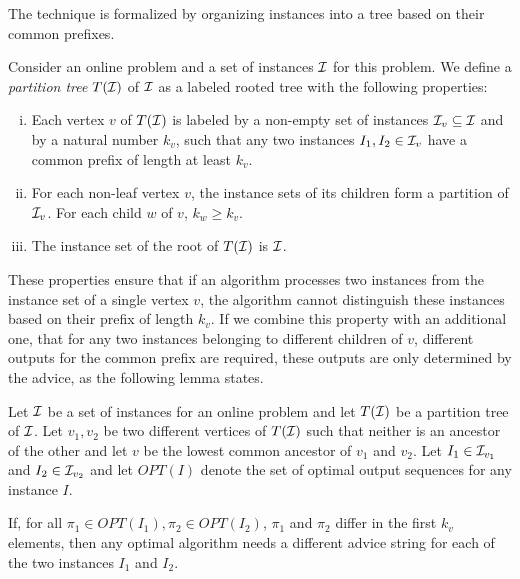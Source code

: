 The technique is formalized by organizing instances into a tree based on
their common prefixes.

\begin{definition}\label{definition:partition-tree}
    Consider an online problem and a set of instances $\mathcal{I}$ for this problem.
    We define a \emph{partition tree} $T(\mathcal{I})$ of $\mathcal{I}$ as a labeled rooted
    tree with the following properties:
    \begin{enumerate}[(i)]
        \item Each vertex $v$ of $T(\mathcal{I})$ is labeled by a non-empty set of
            instances $\mathcal{I}_v \subseteq \mathcal{I}$ and by a natural number $k_v$,
            such that any two instances $I_1, I_2 \in \mathcal{I}_v$ have a common
            prefix of length at least $k_v$.

        \item For each non-leaf vertex $v$, the instance sets of its
            children form a partition of $\mathcal{I}_v$. For each child $w$ of
            $v$, $k_w \geq k_v$.

        \item The instance set of the root of $T(\mathcal{I})$ is $\mathcal{I}$.
    \end{enumerate}
\end{definition}

These properties ensure that if an algorithm processes two instances from
the instance set of a single vertex $v$, the algorithm cannot distinguish
these instances based on their prefix of length $k_v$. If we combine this
property with an additional one, that for any two instances belonging to
different children of $v$, different outputs for the common prefix are
required, these outputs are only determined by the advice, as the
following lemma states.

\begin{lemma}\label{lemma:partition-tree}
    Let $\mathcal{I}$ be a set of instances for an online problem and let $T(\mathcal{I})$
    be a partition tree of $\mathcal{I}$. Let $v_1, v_2$ be two different vertices
    of $T(\mathcal{I})$ such that neither is an ancestor of the other and let $v$
    be the lowest common ancestor of $v_1$ and $v_2$. Let $I_1 \in
    \mathcal{I}_{v_1}$ and $I_2 \in \mathcal{I}_{v_2}$ and let $OPT(I)$ denote the set of
    optimal output sequences for any instance $I$.

    If, for all $\pi_1 \in OPT(I_1), \pi_2 \in OPT(I_2)$, $\pi_1$ and
    $\pi_2$ differ in the first $k_v$ elements, then any optimal algorithm
    needs a different advice string for each of the two instances $I_1$
    and $I_2$.
\end{lemma}

